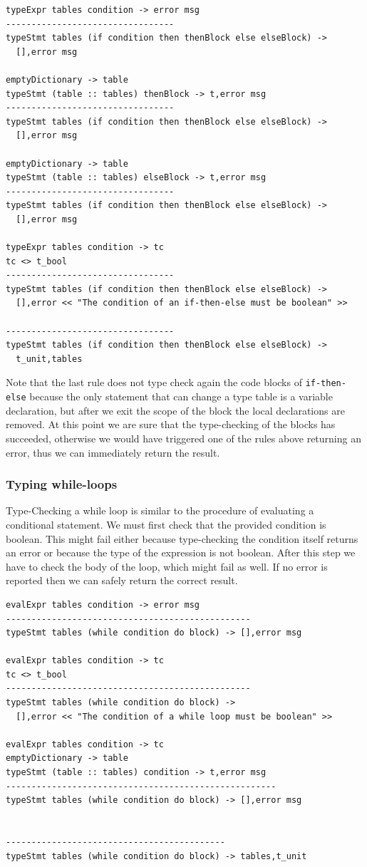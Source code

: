\begin{lstlisting}
typeExpr tables condition -> error msg
---------------------------------
typeStmt tables (if condition then thenBlock else elseBlock) -> 
  [],error msg

emptyDictionary -> table
typeStmt (table :: tables) thenBlock -> t,error msg
---------------------------------
typeStmt tables (if condition then thenBlock else elseBlock) -> 
  [],error msg

emptyDictionary -> table
typeStmt (table :: tables) elseBlock -> t,error msg
---------------------------------
typeStmt tables (if condition then thenBlock else elseBlock) -> 
  [],error msg

typeExpr tables condition -> tc
tc <> t_bool
---------------------------------
typeStmt tables (if condition then thenBlock else elseBlock) ->
  [],error << "The condition of an if-then-else must be boolean" >>

---------------------------------
typeStmt tables (if condition then thenBlock else elseBlock) ->
  t_unit,tables
\end{lstlisting}

Note that the last rule does not type check again the code blocks of \texttt{if-then-else} because the only statement that can change a type table is a variable declaration, but after we exit the scope of the block the local declarations are removed. At this point we are sure that the type-checking of the blocks has succeeded, otherwise we would have triggered one of the rules above returning an error, thus we can immediately return the result.

\subsubsection{Typing while-loops}
Type-Checking a while loop is similar to the procedure of evaluating a conditional statement. We must first check that the provided condition is boolean. This might fail either because type-checking the condition itself returns an error or because the type of the expression is not boolean. After this step we have to check the body of the loop, which might fail as well. If no error is reported then we can safely return the correct result.

\begin{lstlisting}
evalExpr tables condition -> error msg
------------------------------------------------
typeStmt tables (while condition do block) -> [],error msg

evalExpr tables condition -> tc
tc <> t_bool
------------------------------------------------
typeStmt tables (while condition do block) ->
  [],error << "The condition of a while loop must be boolean" >>
  
evalExpr tables condition -> tc
emptyDictionary -> table
typeStmt (table :: tables) condition -> t,error msg
-----------------------------------------------------
typeStmt tables (while condition do block) -> [],error msg


-------------------------------------------
typeStmt tables (while condition do block) -> tables,t_unit
\end{lstlisting}

